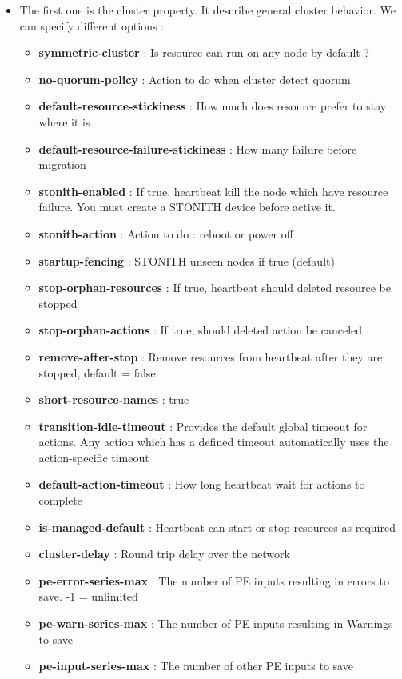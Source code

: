 \documentclass[a4paper,10pt]{report}
\begin{document}
\begin{itemize}
\item The first one is the cluster property. It describe general cluster behavior. We can specify different options :

\begin{itemize}
\item \textbf{symmetric-cluster} : Is resource can run on any node by default ?
\item \textbf{no-quorum-policy} : Action to do when cluster detect quorum
\item \textbf{default-resource-stickiness} : How much does resource prefer to stay where it is
\item \textbf{default-resource-failure-stickiness} : How many failure before migration
\item \textbf{stonith-enabled} : If true, heartbeat kill the node which have resource failure. You must create a STONITH device before active it.
\item \textbf{stonith-action} : Action to do : reboot or power off
\item \textbf{startup-fencing} : STONITH unseen nodes if true (default)
\item \textbf{stop-orphan-resources} : If true, heartbeat should deleted resource be stopped
\item \textbf{stop-orphan-actions} : If true, should deleted action be canceled
\item \textbf{remove-after-stop} : Remove resources from heartbeat after they are stopped, default = false
\item \textbf{short-resource-names} : true
\item \textbf{transition-idle-timeout} : Provides the default global timeout for actions. Any action which has a defined timeout automatically
uses the action-specific timeout
\item \textbf{default-action-timeout} : How long heartbeat wait for actions to complete
\item \textbf{is-managed-default} : Heartbeat can start or stop resources as required
\item \textbf{cluster-delay} : Round trip delay over the network
\item \textbf{pe-error-series-max} : The number of PE inputs resulting in errors to save. -1 = unlimited
\item \textbf{pe-warn-series-max} : The number of PE inputs resulting in Warnings to save
\item \textbf{pe-input-series-max} : The number of other PE inputs to save
\end{itemize}


\end{itemize}
\end{document}
